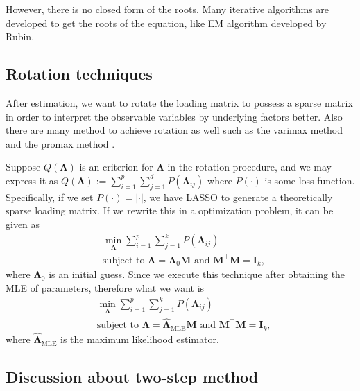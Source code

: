 \documentclass[
  a4paper,
  oneside,
  openany,
  12pt,
  onecolumn]{book}
\theoremstyle{plain}
\theoremstyle{remark}
\begin{document}
However, there is no closed form of the roots. Many iterative algorithms
are developed to get the roots of the equation, like EM algorithm
developed by Rubin\citep{Rubin1982EMAlgorithms}.

\subsection{Rotation techniques}\label{rotation-techniques}

After estimation, we want to rotate the loading matrix to possess a
sparse matrix in order to interpret the observable variables by
underlying factors better. Also there are many method to achieve
rotation as well such as the varimax method and the promax method
\citep{hiroseSparseEstimationNonconcave2015}.

Suppose \(Q(\boldsymbol{\Lambda})\) is an criterion for
\(\boldsymbol{\Lambda}\) in the rotation procedure, and we may express
it as
\(Q(\boldsymbol{\Lambda}):= \sum^p_{i=1}\sum^d_{j=1}P(\boldsymbol{\Lambda}_{ij})\)
where \(P(\cdot)\) is some loss
function\citep{hiroseSparseEstimationNonconcave2015}. Specifically, if
we set \(P(\cdot)=|\cdot|\), we have LASSO to generate a theoretically
sparse loading matrix. If we rewrite this in a optimization problem, it
can be given as \citep{Jennrich2004Rotation} \begin{align*}
&\min_\boldsymbol{\Lambda} \sum^p_{i=1}\sum^k_{j=1}P(\boldsymbol{\Lambda}_{ij})\\
&\text{subject to } \boldsymbol{\Lambda}=\boldsymbol{\Lambda}_0\boldsymbol{M} \text{ and } \boldsymbol{M}^\top\boldsymbol{M}=\boldsymbol{I}_k,
\end{align*} where \(\boldsymbol{\Lambda}_0\) is an initial guess. Since
we execute this technique after obtaining the MLE of parameters,
therefore what we want is \begin{align*}
&\min_\boldsymbol{\Lambda} \sum^p_{i=1}\sum^k_{j=1}P(\boldsymbol{\Lambda}_{ij})\\
&\text{subject to } \boldsymbol{\Lambda}=\hat{\boldsymbol{\Lambda}}_{\text{MLE}}\boldsymbol{M} \text{ and } \boldsymbol{M}^\top\boldsymbol{M}=\boldsymbol{I}_k,
\end{align*} where \(\hat{\boldsymbol{\Lambda}}_{\text{MLE}}\) is the
maximum likelihood estimator.

\subsection{Discussion about two-step
method}\label{discussion-about-two-step-method}
\end{document}

